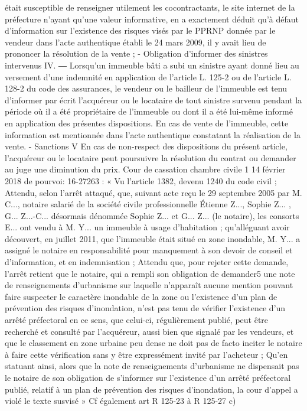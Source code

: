 \documentclass[11pt,a4paper]{report}
\begin{document}
	était susceptible de renseigner utilement les cocontractants, le site internet de la préfecture n'ayant qu'une
	valeur informative, en a exactement déduit qu'à défaut d'information sur l'existence des risques visés par le
	PPRNP donnée par le vendeur dans l'acte authentique établi le 24 mars 2009, il y avait lieu de prononcer la
	résolution de la vente ;
	-
	Obligation d’informer des sinistres intervenus
	IV. ― Lorsqu'un immeuble bâti a subi un sinistre ayant donné lieu au versement d'une indemnité en application
	de l'article L. 125-2 ou de l'article L. 128-2 du code des assurances, le vendeur ou le bailleur de l'immeuble est
	tenu d'informer par écrit l'acquéreur ou le locataire de tout sinistre survenu pendant la période où il a été
	propriétaire de l'immeuble ou dont il a été lui-même informé en application des présentes dispositions. En cas de
	vente de l'immeuble, cette information est mentionnée dans l'acte authentique constatant la réalisation de la
	vente.
	-
	Sanctions
	V En cas de non-respect des dispositions du présent article, l'acquéreur ou le locataire peut poursuivre la
	résolution du contrat ou demander au juge une diminution du prix.
	Cour de cassation chambre civile 1 14 février 2018 \No  de pourvoi: 16-27263 : « Vu l'article 1382, devenu
	1240 du code civil ;
	Attendu, selon l'arrêt attaqué, que, suivant acte reçu le 29 septembre 2005 par M. C..., notaire salarié de la
	société civile professionnelle Étienne Z..., Sophie Z... , G... Z...-C...
	désormais dénommée Sophie Z... et G...
	Z... (le notaire), les consorts E... ont vendu à M. Y... un immeuble à usage d'habitation ; qu'alléguant avoir
	découvert, en juillet 2011, que l'immeuble était situé en zone inondable, M. Y... a assigné le notaire en
	responsabilité pour manquement à son devoir de conseil et d'information, et en indemnisation ;
	Attendu que, pour rejeter cette demande, l'arrêt retient que le notaire, qui a rempli son obligation de demander5
	une note de renseignements d'urbanisme sur laquelle n'apparaît aucune mention pouvant faire suspecter le
	caractère inondable de la zone ou l'existence d'un plan de prévention des risques d'inondation, n'est pas tenu de
	vérifier l'existence d'un arrêté préfectoral en ce sens, que celui-ci, régulièrement publié, peut être recherché et
	consulté par l'acquéreur, aussi bien que signalé par les vendeurs, et que le classement en zone urbaine peu
	dense ne doit pas de facto inciter le notaire à faire cette vérification sans y être expressément invité par
	l'acheteur ;
	Qu'en statuant ainsi, alors que la note de renseignements d'urbanisme ne dispensait pas le notaire de son
	obligation de s'informer sur l'existence d'un arrêté préfectoral publié, relatif à un plan de prévention des risques
	d'inondation, la cour d'appel a violé le texte susvisé »
	Cf également art R 125-23 à R 125-27
	c)
\end{document}
